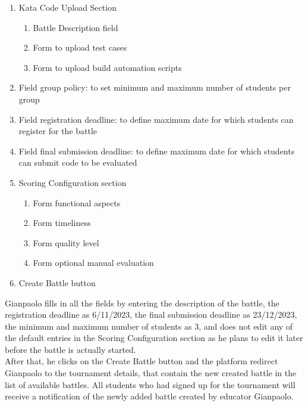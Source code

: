 \begin{enumerate}
	      \begin{enumerate}
		      \item Kata Code Upload Section
		            \begin{enumerate}
			            \item Battle Description field
			            \item Form to upload test cases
			            \item Form to upload build automation scripts
		            \end{enumerate}
		      \item Field group policy: to set minimum and maximum number of students per group
		      \item Field registration deadline: to define maximum date for which students can register for the battle
		      \item Field final submission deadline: to define maximum date for which students can submit code to be evaluated
		      \item Scoring Configuration section

		            \begin{enumerate}
			            \item Form functional aspects
			            \item Form timeliness
			            \item Form quality level
			            \item Form optional manual evaluation
		            \end{enumerate}


		      \item Create Battle button
	      \end{enumerate}

	      Gianpaolo fills in all the fields by entering the description of the battle, the registration deadline as 6/11/2023, the final submission deadline as 23/12/2023, the minimum
	      and maximum number of students as 3, and does not edit any of the default entries in the Scoring Configuration section as he plans to edit it later before the battle is
	      actually started.\\
	      After that, he clicks on the Create Battle button and the platform redirect Gianpaolo to the tournament details, that contain the new created battle in the list of available battles.
	      All students who had signed up for the tournament will receive a notification of the newly added battle created by educator Gianpaolo.


\end{enumerate}
